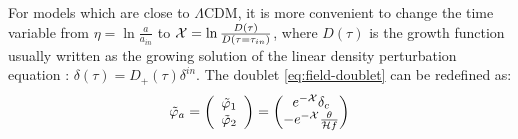 For models which are close to $\Lambda\textrm{CDM}$, it is more convenient
to change the time variable from $\eta=\ln\frac{a}{a_{in}}$ to $\mathcal{X}=\ln\frac{D(\tau)}{D(\tau=\tau_{in})}$,
where $D(\tau)$ is the growth function usually written as the growing
solution of the linear density perturbation equation : $\delta(\tau)=D_{+}(\tau)\delta^{in}$.
The doublet \ref{eq:field-doublet} can be redefined as: 
\begin{equation}
\tilde{\varphi}_{a}=\left(\begin{array}{c}
\tilde{\varphi}_{1}\\
\tilde{\varphi}_{2}
\end{array}\right)=\begin{pmatrix}e^{-\mathcal{X}}\delta_{c}\\
-e^{-\mathcal{X}}\frac{\theta}{\mathcal{H} f}
\end{pmatrix} \label{eq:field-redefinition}
\end{equation}

